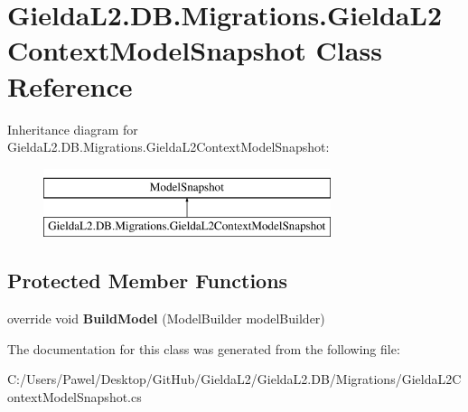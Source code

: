 \hypertarget{class_gielda_l2_1_1_d_b_1_1_migrations_1_1_gielda_l2_context_model_snapshot}{}\section{Gielda\+L2.\+D\+B.\+Migrations.\+Gielda\+L2\+Context\+Model\+Snapshot Class Reference}
\label{class_gielda_l2_1_1_d_b_1_1_migrations_1_1_gielda_l2_context_model_snapshot}
Inheritance diagram for Gielda\+L2.\+D\+B.\+Migrations.\+Gielda\+L2\+Context\+Model\+Snapshot\+:\begin{figure}[H]
\begin{center}
\leavevmode
\includegraphics[height=2.000000cm]{class_gielda_l2_1_1_d_b_1_1_migrations_1_1_gielda_l2_context_model_snapshot}
\end{center}
\end{figure}
\subsection*{Protected Member Functions}
\begin{DoxyCompactItemize}
\item 
\mbox{\label{class_gielda_l2_1_1_d_b_1_1_migrations_1_1_gielda_l2_context_model_snapshot_acb922b409c26a039f0365e1fd7d042e6}} 
override void {\bfseries Build\+Model} (Model\+Builder model\+Builder)
\end{DoxyCompactItemize}


The documentation for this class was generated from the following file\+:\begin{DoxyCompactItemize}
\item 
C\+:/\+Users/\+Pawel/\+Desktop/\+Git\+Hub/\+Gielda\+L2/\+Gielda\+L2.\+D\+B/\+Migrations/Gielda\+L2\+Context\+Model\+Snapshot.\+cs\end{DoxyCompactItemize}
